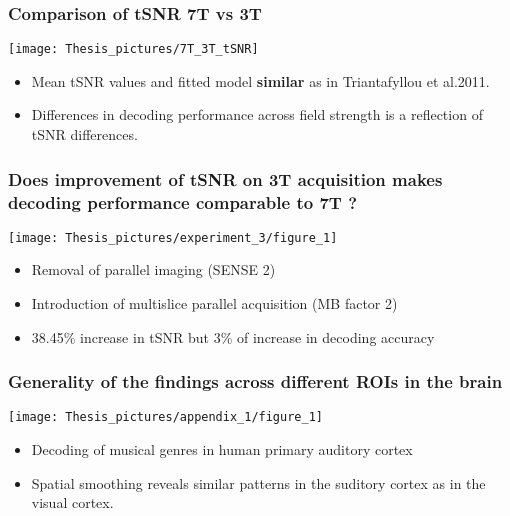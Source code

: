 \documentclass{beamer}
\begin{document}
  \begin{frame}
    \frametitle{Comparison of tSNR 7T vs 3T}
        \begin{center}
            \texttt{[image: Thesis\_pictures/7T\_3T\_tSNR]}
        \end{center}
        \begin{itemize}
			\item Mean tSNR values and fitted model \textbf{similar} as in Triantafyllou et al.{2011}.
			\item Differences in decoding performance across field strength is a reflection of tSNR differences.
		\end{itemize}
    \end{frame}


  \begin{frame}
    \frametitle{Does improvement of tSNR on 3T acquisition makes decoding performance comparable to 7T ?}
        \begin{center}
            \texttt{[image: Thesis\_pictures/experiment\_3/figure\_1]}
        \end{center}
        \begin{itemize}
			 \item Removal of parallel imaging (SENSE 2)
			 \item Introduction of multislice parallel acquisition (MB factor 2)
			 \item 38.45\% increase in tSNR but 3\% of increase in decoding accuracy
		\end{itemize}  
    \end{frame}


  \begin{frame}
    \frametitle{Generality of the findings across different ROIs in the brain}
        
        \begin{center}
            \texttt{[image: Thesis\_pictures/appendix\_1/figure\_1]}
        \end{center}
        \begin{itemize}
			 \item Decoding of musical genres in human primary auditory cortex
			 \item Spatial smoothing reveals similar patterns in the suditory cortex 
			 as in the visual cortex.
		\end{itemize}  
    \end{frame}
\end{document}
